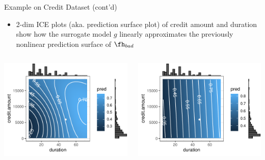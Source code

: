 \documentclass[11pt,compress,t,notes=noshow, aspectratio=169, xcolor=table]{beamer}
\newcommand{\pih}{\fh}
\begin{document}
\begin{frame}[c]{Example on Credit Dataset (cont'd)}

\begin{itemize}	
	\item 2-dim ICE plots (aka. prediction surface plot) of credit amount and duration show how the surrogate model $g$ linearly approximates the previously nonlinear prediction surface of $\pih_{bad}$ 
\end{itemize}
\vspace{-0.4cm}
 \begin{columns}
	\begin{column}{0.47\textwidth}
		\begin{center}
		\includegraphics[width=1\textwidth]{figure/lime_credit_ice1.pdf}
		\end{center}		
	\end{column}
	\begin{column}{0.46\textwidth}  
		\begin{center}
				\includegraphics[width=1\textwidth]{figure/lime_credit_ice2.pdf}
		\end{center}
			

\end{column}
\end{columns}
\end{frame}
\end{document}
